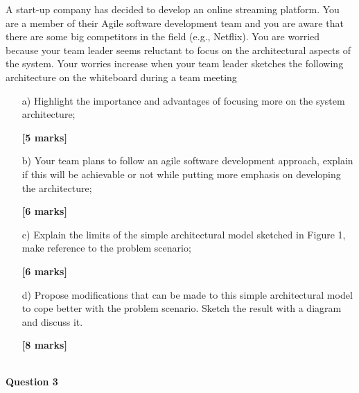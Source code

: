 \documentclass[11pt]{article}
\begin{document}
          A start-up company has decided to develop an online streaming platform. You are a member of their Agile software development team and you are aware that there are some big competitors in the field (e.g., Netflix). You are worried because your team leader seems reluctant to focus on the architectural aspects of the system. Your worries increase when your team leader sketches the following architecture on the whiteboard during a team meeting
        \begin{enumerate}
            
        \item[a) ]Highlight the importance and advantages of focusing more on the system architecture;
        \begin{flushright}
            \textbf{[5 marks]}
        \end{flushright}
    
        \item[b) ]Your team plans to follow an agile software development approach, explain if this will be achievable or not while putting more emphasis on developing the architecture;
        \begin{flushright}
            \textbf{[6 marks]}
        \end{flushright}
    
        \item[c) ]Explain the limits of the simple architectural model sketched in Figure 1, make reference to the problem scenario;
        \begin{flushright}
            \textbf{[6 marks]}
        \end{flushright}
    
        \item[d) ]Propose modifications that can be made to this simple architectural model to cope better with the problem scenario. Sketch the result with a diagram and discuss it.
        \begin{flushright}
            \textbf{[8 marks]}
        \end{flushright}
    
        \end{enumerate}
        ~\\
    
        \textbf{Question 3}
\end{document}

